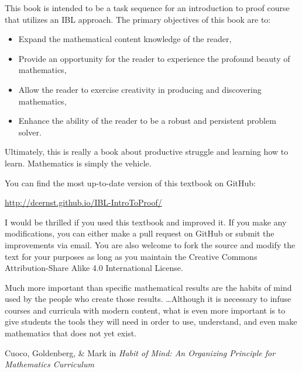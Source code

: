 This book is intended to be a task sequence for an introduction to proof course that utilizes an IBL approach. The primary objectives of this book are to:
\begin{itemize}
\item Expand the mathematical content knowledge of the reader,
\item Provide an opportunity for the reader to experience the profound beauty of mathematics,
\item Allow the reader to exercise creativity in producing and discovering mathematics,
\item Enhance the ability of the reader to be a robust and persistent problem solver.
\end{itemize}
Ultimately, this is really a book about productive struggle and learning how to learn. Mathematics is simply the vehicle.

You can find the most up-to-date version of this textbook on GitHub:
\begin{center}
\url{http://dcernst.github.io/IBL-IntroToProof/}
\end{center}
I would be thrilled if you used this textbook and improved it. If you make any modifications, you can either make a pull request on GitHub or submit the improvements via email.  You are also welcome to fork the source and modify the text for your purposes as long as you maintain the Creative Commons Attribution-Share Alike 4.0 International License.


\epigraph{Much more important than specific mathematical results are the habits of mind used by the people who create those results. \ldots Although it is necessary to infuse courses and curricula with modern content, what is even more important is to give students the tools they will need in order to use, understand, and even make mathematics that does not yet exist.}{Cuoco, Goldenberg, \& Mark in \emph{Habit of Mind: An Organizing Principle for Mathematics Curriculum}}